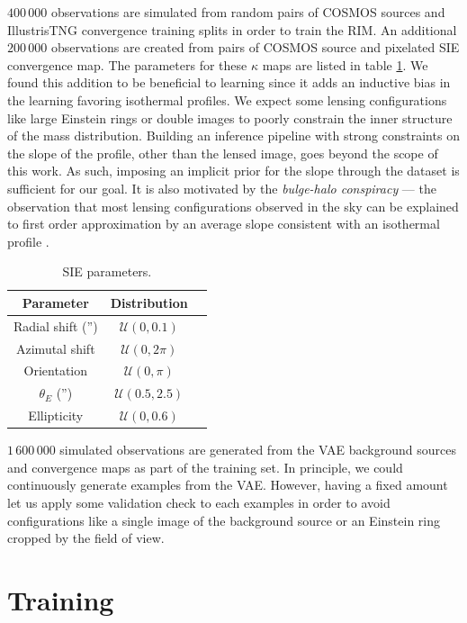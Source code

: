 $400\,000$ observations are simulated from random pairs of COSMOS sources 
and IllustrisTNG convergence training splits in order to train the RIM. 
An additional $200\,000$ observations are created from pairs 
of COSMOS source and pixelated SIE convergence map. 
The parameters for these $\kappa$ maps are listed in table \ref{tab:sie}. 
We found this addition to be beneficial to learning since it adds an 
inductive bias in the learning favoring isothermal profiles.
We expect some lensing configurations like 
large Einstein rings or double images to poorly constrain the inner structure of the 
mass distribution. 
Building an inference pipeline with strong constraints on the 
slope of the profile, other than the lensed image, goes beyond the scope of this work. 
As such, imposing an implicit prior for the slope through 
the dataset is sufficient for our goal. 
It is also motivated by the \textit{bulge-halo conspiracy} --- 
the observation that most lensing configurations observed in the sky can be explained 
to first order approximation by 
an average slope consistent with an isothermal profile \citep{Auger2010,Dutton2014}.

\begin{table}[htb!]
\centering
\caption{SIE parameters.}
\label{tab:sie}
\begin{tabular}{ccc}
        Parameter &  Distribution \\
        \hline \hline
         Radial shift ('') & $\mathcal{U}(0, 0.1)$ \\
        Azimutal shift & $\mathcal{U}(0, 2\pi)$ \\
        Orientation & $\mathcal{U}(0, \pi)$ \\
        $\theta_E$ ('') & $\mathcal{U}(0.5, 2.5)$ \\
        Ellipticity & $\mathcal{U}(0, 0.6)$ \\
        \hline
\end{tabular}
\end{table}


$1\,600\,000$ simulated observations are generated from the VAE 
background sources and convergence maps as part of the training set. 
In principle, we could continuously generate examples from the VAE. 
However, having a fixed amount let us apply some validation check to each 
examples in order to avoid configurations like a
single image of the background 
source or an Einstein ring cropped by the field of view.




\section{Training}\label{sec:training}

